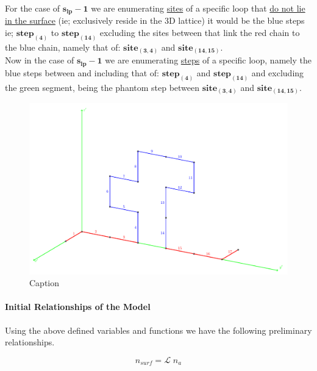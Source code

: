 \documentclass[12pt,letterpaper]{article}
\newcommand{\leng}{\mathcal{L}}
\begin{document}
For the case of
$
\boldsymbol{
    s_{lp}
    -
    1
}
$
we are enumerating \underline{sites} of a specific loop that \underline{do not lie in the surface} (ie; exclusively reside in the 3D lattice) it would be the blue steps ie; 
$
\boldsymbol{
step_{(4)}
}
$ 
to 
$
\boldsymbol{
    step_{(14)}
}
$ excluding the sites between that link the red chain to the blue chain, namely that of: 
$
\boldsymbol{
site_{(3,4)}
}
$ 
and 
$
\boldsymbol{
site_{(14,15)}
}
$.\\

Now in the case of $
\boldsymbol{
    s_{lp}
    -
    1
}
$
we are enumerating \underline{steps} of a specific loop, namely the blue steps between and including that of: 
$
\boldsymbol{
    step_{(4)}
}
$ 
and 
$
\boldsymbol{
    step_{(14)}
}
$ 
and excluding the green segment, being the phantom step between 
$
\boldsymbol{
site_{(3,4)}
}
$ 
and 
$
\boldsymbol{
site_{(14,15)}
}
$.

\begin{figure}[H]
    \centering
    \includegraphics[scale=0.50]{stickball1.pdf}
    \caption{Caption}
    \label{fig:loopSchem}
\end{figure}


\paragraph{Initial Relationships of the Model} Using the above defined variables and functions we have the following preliminary relationships.

\begin{equation}
	    n_{surf}= \leng\;n_a
	    \label{eq.nsurf}
\end{equation}
\end{document}
